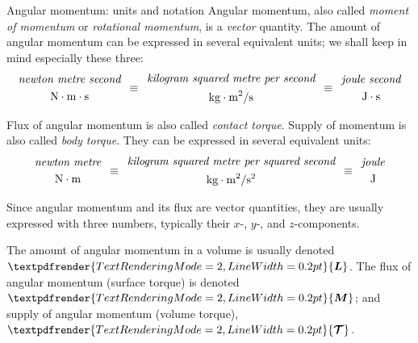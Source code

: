 \documentclass[a4paper,12pt,%
onecolumn,oneside,%
british%
]{memoir}
\renewcommand*{\bm}[1]{\textpdfrender{TextRenderingMode=2,LineWidth=0.2pt}{\boldsymbol{#1}}}
\renewcommand*{\|}[1][]{\nonscript\:#1\vert\nonscript\:\mathopen{}}
\newcommand*{\yL}{\bm{L}}%
\newcommand*{\ytoo}{\mathcal{T}}%
\newcommand*{\yto}{\bm{\ytoo}}%
\newcommand*{\yM}{\bm{M}}%
\begin{document}
\begin{definition}{Angular momentum: units and notation}
  Angular momentum, also called \emph{moment of momentum} or \emph{rotational momentum}, is a \emph{vector} quantity. The amount of angular momentum can be expressed in several equivalent units; we shall keep in mind especially these three:
  \begin{equation*}
    \begin{gathered}
      \textit{newton metre second}\\
      \unit{N\cdot m \cdot s}
    \end{gathered}
\enskip\equiv\enskip
    \begin{gathered}
      \textit{kilogram squared metre per second}\\
      \unit{kg\cdot m^{2}/s}
    \end{gathered}
\enskip\equiv\enskip
    \begin{gathered}
      \textit{joule second}\\
      \unit{J\cdot s}
    \end{gathered}
\end{equation*}

\smallskip

Flux of angular momentum is also called \emph{contact torque}. Supply of momentum is also called \emph{body torque}. They can be expressed in several equivalent units:
\begin{equation*}
    \begin{gathered}
      \textit{newton metre}\\
      \unit{N\cdot m}
    \end{gathered}
\enskip\equiv\enskip
    \begin{gathered}
      \textit{kilogram squared metre per squared second}\\
      \unit{kg\cdot m^{2}/s^{2}}
    \end{gathered}
\enskip\equiv\enskip
    \begin{gathered}
      \textit{joule}\\
      \unit{J}
    \end{gathered}
\end{equation*}

Since angular momentum and its flux are vector quantities, they are usually expressed with three numbers, typically their $x$-, $y$-, and $z$-components.

\smallskip

The amount of angular momentum in a volume is usually denoted $\yL$. The flux of angular momentum (surface torque) is denoted $\yM$; and supply of angular momentum (volume torque), $\yto$.
\end{definition}
\end{document}
